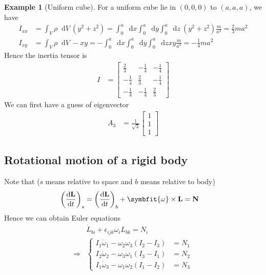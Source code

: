 \documentclass[twoside,9pt]{article}
\numberwithin{equation}{section} %
\newcommand{\lms}{\fontfamily{lmss}\selectfont} %
\renewcommand*\d{\mathop{}\!\mathrm{d}}
\theoremstyle{definition}
\newtheorem{example}{\lms Example}[section]
\theoremstyle{remark}
\begin{document}
\begin{example}[Uniform cube]
For a uniform cube lie in $(0,0,0)$ to $(a,a,a)$, we have
\begin{align}
    I_{xx} &= \int_V\rho\d V\ (y^2 + z^2)
    = \int_0^a\d x\int_0^a\d y\int_0^a\d z~ (y^2 + z^2)\frac{m}{a^3}
    = \frac{2}{3}ma^2\\
    I_{xy} &= \int_V\rho\d V\ -xy
    = -\int_0^a\d x\int_0^a\d y \int_0^a\d z xy\frac{m}{a^3}
    = -\frac{1}{4}ma^2
\end{align}
Hence the inertia tensor is
\begin{align}
    I &= \left[\begin{array}{rrr}
        \frac{2}{3} & -\frac{1}{4} & -\frac{1}{4}\\
        -\frac{1}{4} & \frac{2}{3} & -\frac{1}{4}\\
        -\frac{1}{4} & -\frac{1}{4} & \frac{2}{3}
    \end{array}\right]
\end{align}
We can first have a guess of eigenvector
\begin{align}
    A_3 &= \frac{1}{\sqrt{3}}\begin{bmatrix}
        1\\ 1 \\ 1
    \end{bmatrix}
\end{align}
\end{example}

\subsection{Rotational motion of a rigid body}
Note that ($s$ means relative to space and $b$ means relative to body)
\begin{align}
    \left(\frac{\d\mathbf{L}}{\d t}\right)_s &= 
    \left(\frac{\d\mathbf{L}}{\d t}\right)_b + \symbfit{\omega}\times\mathbf{L}
    = \mathbf{N}
\end{align}
Hence we can obtain Euler equations
\begin{align}
    &\dot L_{bi} + \epsilon_{ijk}\omega_i L_{bk} = N_i\\
    \Rightarrow &\left\{
    \begin{aligned}
        I_1\dot\omega_1 - \omega_2\omega_3(I_2 - I_3) &= N_1\\
        I_2\dot\omega_2 - \omega_3\omega_1(I_3 - I_1) &= N_2\\
        I_1\dot\omega_3 - \omega_1\omega_2(I_1 - I_2) &= N_3
    \end{aligned}
    \right.
\end{align}
\end{document}
